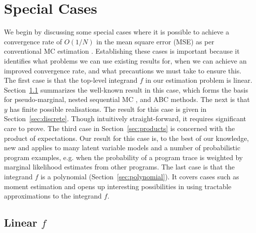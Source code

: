 
\section{Special Cases}
\label{sec:special_cases}

We begin by discussing some special cases where it is possible to achieve a
convergence rate of $O(1/N)$ in the mean square error (MSE) as per conventional
MC estimation \citep{robert2004monte}.  
Establishing these cases is important because it identifies what problems we can use existing results for,
when we can achieve an improved convergence rate, and what precautions we must take to ensure this.
The first case is that the top-level integrand $f$ in our estimation problem is linear. 
Section~\ref{sec:linear_case} summarizes the well-known result in this case, which forms the basis for pseudo-marginal, 
nested sequential MC \citep{andersson2015nested}, and ABC methods. The next is that $y$ has finite possible realisations.
The result for this case is given in Section~\ref{sec:discrete}. Though intuitively straight-forward, it 
requires significant care to prove. The third case in Section~\ref{sec:products} is concerned with the product of expectations.
Our result for this case is, to the best of our knowledge, new and applies to many latent variable models and a number 
of probabilistic program examples, e.g. when the probability of a program trace
is weighted by marginal likelihood estimates from other programs.
The last case is that the integrand $f$ is a polynomial (Section~\ref{sec:polynomial}). It 
covers cases such as moment estimation and opens up interesting possibilities in using tractable 
approximations to the integrand $f$.

\subsection{Linear $f$}
\label{sec:linear_case}

